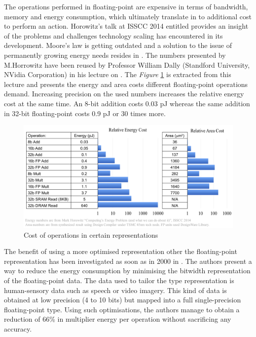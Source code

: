 The operations performed in floating-point are expensive in terms of bandwidth, memory and energy consumption, which ultimately translate in to additional cost to perform an action. Horowitz's talk at ISSCC 2014 \cite{Horowitz2014} entitled  provides an insight of the problems and challenges technology scaling has encountered in its development. Moore's law is getting outdated and a solution to the issue of permanently growing energy needs resides in . The numbers presented by M.Horrowitz have been reused by Professor William Dally (Standford University, NVidia Corporation) in his lecture on  \cite{Nips2015}. The \emph{Figure} \ref{fig:OpCosts} is extracted from this lecture and presents the energy and area costs different floating-point operations demand. Increasing precision on the used numbers increases the relative energy cost at the same time. An 8-bit addition costs 0.03 pJ whereas the same addition in 32-bit floating-point costs 0.9 pJ or 30 times more.

\begin{figure}[htbp]
	\centering
		\includegraphics[width=\textwidth]{Figures/OpCosts.png}
	\caption[Operation costs]{Cost of operations in certain representations \cite{Nips2015,Horowitz2014}}
	\label{fig:OpCosts}
\end{figure}

The benefit of using a more optimised representation other the floating-point representation has been investigated as soon as in 2000 in \cite{Tong2000}. The authors present a way to reduce the energy consumption by minimising the bitwidth representation of the floating-point data. The data used to tailor the type representation is human-sensory data such as speech or video imagery. This kind of data is obtained at low precision (4 to 10 bits) but mapped into a full single-precision floating-point type. Using such optimisations, the authors manage to obtain a reduction of 66\% in multiplier energy per operation without sacrificing any accuracy.

